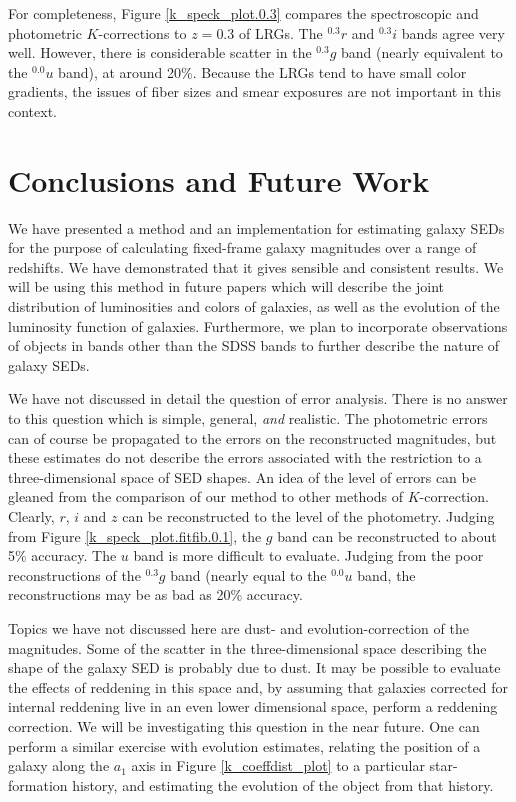 \documentclass[10pt,preprint]{aastex}
\newcommand{\band}[2]{\ensuremath{^{#1}{#2}}}
\begin{document}
For completeness, Figure \ref{k_speck_plot.0.3} compares the
spectroscopic and photometric $K$-corrections to $z=0.3$ of LRGs. The
\band{0.3}{r} and \band{0.3}{i} bands agree very well. However, there
is considerable scatter in the \band{0.3}{g} band (nearly equivalent
to the \band{0.0}{u} band), at around 20\%. Because the LRGs tend to
have small color gradients, the issues of fiber sizes and smear
exposures are not important in this context.

\section{Conclusions and Future Work}
\label{conclusions}

We have presented a method and an implementation for estimating galaxy
SEDs for the purpose of calculating fixed-frame galaxy magnitudes over
a range of redshifts. We have demonstrated that it gives sensible and
consistent results. We will be using this method in future papers
which will describe the joint distribution of luminosities and colors
of galaxies, as well as the evolution of the luminosity function of
galaxies. Furthermore, we plan to incorporate observations of objects
in bands other than the SDSS bands to further describe the nature of
galaxy SEDs.

We have not discussed in detail the question of error analysis. There
is no answer to this question which is simple, general, {\it and}
realistic. The photometric errors can of course be propagated to the
errors on the reconstructed magnitudes, but these estimates do not
describe the errors associated with the restriction to a
three-dimensional space of SED shapes. An idea of the level of errors
can be gleaned from the comparison of our method to other methods of
$K$-correction. Clearly, $r$, $i$ and $z$ can be reconstructed to the
level of the photometry. Judging from Figure
\ref{k_speck_plot.fitfib.0.1}, the $g$ band can be reconstructed to
about 5\% accuracy. The $u$ band is more difficult to evaluate.
Judging from the poor reconstructions of the $\band{0.3}{g}$ band
(nearly equal to the $\band{0.0}{u}$ band, the reconstructions may be
as bad as 20\% accuracy.

Topics we have not discussed here are dust- and evolution-correction
of the magnitudes. Some of the scatter in the three-dimensional space
describing the shape of the galaxy SED is probably due to dust. It may
be possible to evaluate the effects of reddening in this space and, by
assuming that galaxies corrected for internal reddening live in an
even lower dimensional space, perform a reddening correction. We will
be investigating this question in the near future. One can perform a
similar exercise with evolution estimates, relating the position of a
galaxy along the $a_1$ axis in Figure \ref{k_coeffdist_plot} to a
particular star-formation history, and estimating the evolution of the
object from that history.
\end{document}
